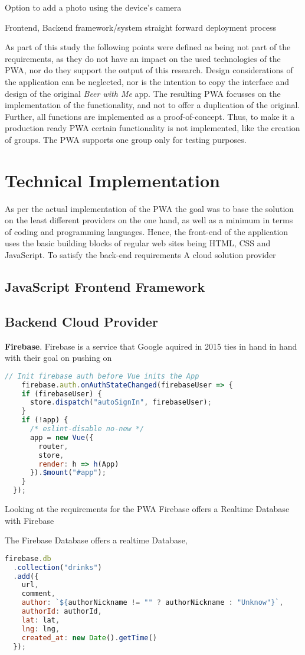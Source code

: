 Option to add a photo using the device’s camera


Frontend, Backend framework/system
straight forward deployment process

As part of this study the following points were defined as being not part of the requirements, as they do not have an impact on the used technologies of the PWA, nor do they support the output of this research. Design considerations of the application can be neglected, nor is the intention to copy the interface and design of the original \textit{Beer with Me} app. The resulting PWA focusses on the implementation of the functionality, and not to offer a duplication of the original. Further, all functions are implemented as a proof-of-concept. Thus, to make it a production ready PWA certain functionality is not implemented, like the creation of groups. The PWA supports one group only for testing purposes.


\section{Technical Implementation}
As per the actual implementation of the PWA the goal was to base the solution on the least different providers on the one hand, as well as a minimum in terms of coding and programming languages. Hence, the front-end of the application uses the basic building blocks of regular web sites being HTML, CSS and JavaScript. To satisfy the back-end requirements A cloud solution provider

\subsection{JavaScript Frontend Framework}

\subsection{Backend Cloud Provider}
\textbf{Firebase}. Firebase is a service that Google aquired in 2015 ties in hand in hand with their goal on pushing on

\begin{lstlisting}[language=JavaScript, caption=Firebase Auth initiation, label=lst:firebase-auth]
  // Init firebase auth before Vue inits the App
    firebase.auth.onAuthStateChanged(firebaseUser => {
    if (firebaseUser) {
      store.dispatch("autoSignIn", firebaseUser);
    }
    if (!app) {
      /* eslint-disable no-new */
      app = new Vue({
        router,
        store,
        render: h => h(App)
      }).$mount("#app");
    }
  });
  \end{lstlisting}

Looking at the requirements for the PWA Firebase offers a Realtime Database with Firebase

The Firebase Database offers a realtime Database,
\begin{lstlisting}[language=JavaScript, caption=Firebase, label=lst:firebase-add]
firebase.db
  .collection("drinks")
  .add({
    url,
    comment,
    author: `${authorNickname != "" ? authorNickname : "Unknow"}`,
    authorId: authorId,
    lat: lat,
    lng: lng,
    created_at: new Date().getTime()
  });
\end{lstlisting}
